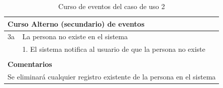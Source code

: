 \begin{table}[h!]
{\begin{tabular}{|l|l|l|l|}
        \hline
        \multicolumn{4}{|l|}{{\cellcolor[rgb]{0.886,0.886,0.886}}\textbf{Curso Alterno (secundario) de eventos}}                                                                                                                                                                                        \\ 
        \hline
        3a & \multicolumn{3}{l|}{La persona no existe en el sistema}                                                                                                                                                                                                                                    \\ 
        \hline
        & \multicolumn{3}{l|}{1. El sistema notifica al usuario de que la persona no existe}                                                                                                                                                                                                         \\ 
        \hline
        \multicolumn{4}{l}{}                                                                                                                                                                                                                                                                            \\ 
        \hline
        \multicolumn{4}{|l|}{{\cellcolor[rgb]{0.886,0.886,0.886}}\textbf{Comentarios}}                                                                                                                                                                                                                  \\ 
        \hline
        \multicolumn{4}{|l|}{Se eliminará cualquier registro existente de la persona en el sistema}                                                                                                                                                                                                     \\
        \hline
        \end{tabular}
    }
    \caption{Curso de eventos del caso de uso 2}
\end{table}

